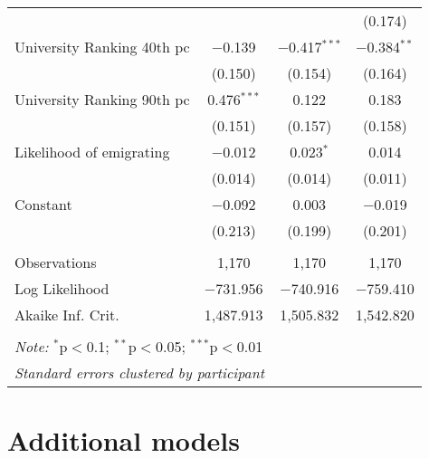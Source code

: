 \documentclass[12pt]{article}
\begin{document}
\begin{appendices}
\begin{table}[H]
\begin{tabular}{@{\extracolsep{5pt}}lccc}
  &  &  & (0.174) \\ 
  University Ranking 40th pc & $-$0.139 & $-$0.417$^{***}$ & $-$0.384$^{**}$ \\ 
  & (0.150) & (0.154) & (0.164) \\ 
  University Ranking 90th pc & 0.476$^{***}$ & 0.122 & 0.183 \\ 
  & (0.151) & (0.157) & (0.158) \\ 
  Likelihood of emigrating & $-$0.012 & 0.023$^{*}$ & 0.014 \\ 
  & (0.014) & (0.014) & (0.011) \\ 
  Constant & $-$0.092 & 0.003 & $-$0.019 \\ 
  & (0.213) & (0.199) & (0.201) \\ 
 \hline \\[-1.8ex] 
Observations & 1,170 & 1,170 & 1,170 \\ 
Log Likelihood & $-$731.956 & $-$740.916 & $-$759.410 \\ 
Akaike Inf. Crit. & 1,487.913 & 1,505.832 & 1,542.820 \\   
\hline 
\hline \\[-1.8ex] 
\multicolumn{4}{l}{ \textit{Note:} $^{*}$p$<$0.1; $^{**}$p$<$0.05; $^{***}$p$<$0.01 }  \\ 
\multicolumn{4}{l}{\textit{Standard errors clustered by participant}}
\end{tabular} 
\end{table} 

\section{Additional models}


\end{appendices}
\end{document}
